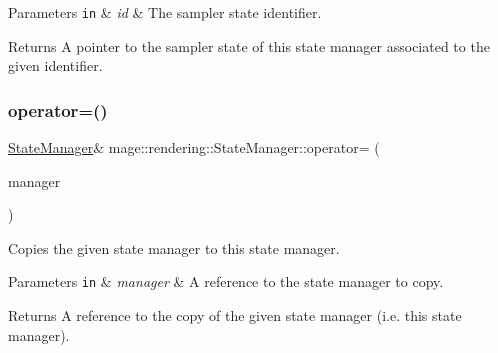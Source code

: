 \begin{DoxyParams}[1]{Parameters}
\mbox{\tt in}  & {\em id} & The sampler state identifier. \\
\hline
\end{DoxyParams}
\begin{DoxyReturn}{Returns}
A pointer to the sampler state of this state manager associated to the given identifier. 
\end{DoxyReturn}
\hypertarget{classmage_1_1rendering_1_1_state_manager_a07e3b6663a4d3c814cddbd920bd4ced4}{}\label{classmage_1_1rendering_1_1_state_manager_a07e3b6663a4d3c814cddbd920bd4ced4} 
\subsubsection{\texorpdfstring{operator=()}{operator=()}\hspace{0.1cm}{\footnotesize\ttfamily [1/2]}}
{\footnotesize\ttfamily \hyperlink{classmage_1_1rendering_1_1_state_manager}{State\+Manager}\& mage\+::rendering\+::\+State\+Manager\+::operator= (\begin{DoxyParamCaption}\item[{const \hyperlink{classmage_1_1rendering_1_1_state_manager}{State\+Manager} \&}]{manager }\end{DoxyParamCaption})\hspace{0.3cm}{\ttfamily [delete]}}

Copies the given state manager to this state manager.


\begin{DoxyParams}[1]{Parameters}
\mbox{\tt in}  & {\em manager} & A reference to the state manager to copy. \\
\hline
\end{DoxyParams}
\begin{DoxyReturn}{Returns}
A reference to the copy of the given state manager (i.\+e. this state manager). 
\end{DoxyReturn}
\hypertarget{classmage_1_1rendering_1_1_state_manager_a75eedc5c3a5345de8b6a1c4dea7491a1}{}\label{classmage_1_1rendering_1_1_state_manager_a75eedc5c3a5345de8b6a1c4dea7491a1} 
